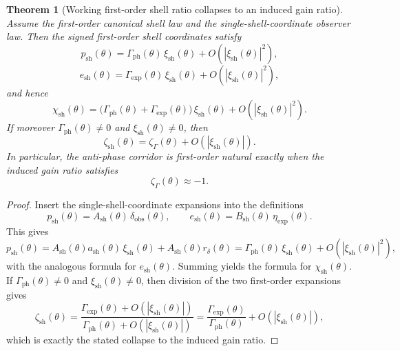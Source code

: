 \documentclass[12pt,a4paper]{article}
\newtheorem{theorem}{Theorem}[section]
\begin{document}
\begin{theorem}[Working first-order shell ratio collapses to an induced gain ratio]
Assume the first-order canonical shell law and the single-shell-coordinate observer law. Then the signed first-order shell coordinates satisfy
\[
 p_{\mathrm{sh}}(\theta)=\Gamma_{\mathrm{ph}}(\theta)\,\xi_{\mathrm{sh}}(\theta)+O\!\left(|\xi_{\mathrm{sh}}(\theta)|^2\right),
\]
\[
 e_{\mathrm{sh}}(\theta)=\Gamma_{\mathrm{exp}}(\theta)\,\xi_{\mathrm{sh}}(\theta)+O\!\left(|\xi_{\mathrm{sh}}(\theta)|^2\right),
\]
and hence
\[
 \chi_{\mathrm{sh}}(\theta)
 =\bigl(\Gamma_{\mathrm{ph}}(\theta)+\Gamma_{\mathrm{exp}}(\theta)\bigr)\,\xi_{\mathrm{sh}}(\theta)
 +O\!\left(|\xi_{\mathrm{sh}}(\theta)|^2\right).
\]
If moreover $\Gamma_{\mathrm{ph}}(\theta)\neq 0$ and $\xi_{\mathrm{sh}}(\theta)\neq 0$, then
\[
 \zeta_{\mathrm{sh}}(\theta)
 =\zeta_{\Gamma}(\theta)+O\!\left(|\xi_{\mathrm{sh}}(\theta)|\right).
\]
In particular, the anti-phase corridor is first-order natural exactly when the induced gain ratio satisfies
\[
 \zeta_{\Gamma}(\theta)\approx -1.
\]
\end{theorem}

\begin{proof}
Insert the single-shell-coordinate expansions into the definitions
\[
 p_{\mathrm{sh}}(\theta)=A_{\mathrm{sh}}(\theta)\,\delta_{\mathrm{obs}}(\theta),
 \qquad
 e_{\mathrm{sh}}(\theta)=B_{\mathrm{sh}}(\theta)\,\eta_{\mathrm{exp}}(\theta).
\]
This gives
\[
 p_{\mathrm{sh}}(\theta)
 =A_{\mathrm{sh}}(\theta)a_{\mathrm{sh}}(\theta)\,\xi_{\mathrm{sh}}(\theta)
 +A_{\mathrm{sh}}(\theta)r_{\delta}(\theta)
 =\Gamma_{\mathrm{ph}}(\theta)\,\xi_{\mathrm{sh}}(\theta)+O\!\left(|\xi_{\mathrm{sh}}(\theta)|^2\right),
\]
with the analogous formula for $e_{\mathrm{sh}}(\theta)$. Summing yields the formula for $\chi_{\mathrm{sh}}(\theta)$. If $\Gamma_{\mathrm{ph}}(\theta)\neq 0$ and $\xi_{\mathrm{sh}}(\theta)\neq 0$, then division of the two first-order expansions gives
\[
 \zeta_{\mathrm{sh}}(\theta)
 =\frac{\Gamma_{\mathrm{exp}}(\theta)+O(|\xi_{\mathrm{sh}}(\theta)|)}{\Gamma_{\mathrm{ph}}(\theta)+O(|\xi_{\mathrm{sh}}(\theta)|)}
 =\frac{\Gamma_{\mathrm{exp}}(\theta)}{\Gamma_{\mathrm{ph}}(\theta)}+O\!\left(|\xi_{\mathrm{sh}}(\theta)|\right),
\]
which is exactly the stated collapse to the induced gain ratio.
\end{proof}
\end{document}
